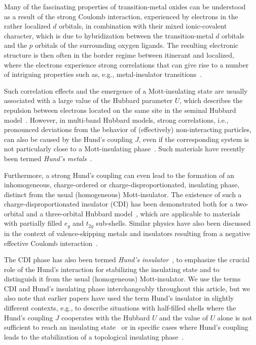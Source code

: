 \documentclass[aps,prb,twocolumn,superscriptaddress,10pt]{revtex4-1}
\begin{document}
Many of the fascinating properties of transition-metal oxides can be understood as a result of the strong Coulomb interaction, experienced by electrons in the rather localized $d$ orbitals, in combination with their mixed ionic-covalent character, which is due to hybridization between the transition-metal $d$ orbitals and the $p$ orbitals of the surrounding oxygen ligands. The resulting electronic structure is then often in the border regime between itinerant and localized, where the electrons experience strong correlations that can give rise to a number of intriguing properties such as, e.g., metal-insulator transitions~\cite{imada_metal-insulator_1998}.

Such correlation effects and the emergence of a Mott-insulating state are usually associated with a large value of the Hubbard parameter $U$, which describes the repulsion between electrons located on the same site in the seminal Hubbard model~\cite{hubbard_electron_1963, kanamori_electron_1963}. However, in multi-band Hubbard models, strong correlations, i.e., pronounced deviations from the behavior of (effectively) non-interacting particles, can also be caused by the Hund's coupling $J$, even if the corresponding system is not particularly close to a Mott-insulating phase~\cite{georges_strong_2013}. Such materials have recently been termed \emph{Hund's metals}~\cite{yin_kinetic_2011, chatzieleftheriou_enhancement_2020, richaud_interaction-resistant_2021}.
%

Furthermore, a strong Hund's coupling can even lead to the formation of an inhomogeneous, charge-ordered or charge-disproportionated, insulating phase, distinct from the usual (homogeneous) Mott-insulator. The existence of such a charge-disproportionated insulator (CDI) has been demonstrated both for a two-orbital and a three-orbital Hubbard model~\cite{subedi_low-energy_2015, isidori_charge_2019, ryee_nonlocal_2020}, which are applicable to materials with partially filled $e_g$ and $t_{2g}$ sub-shells. Similar physics have also been discussed in the context of valence-skipping metals and insulators resulting from a negative effective Coulomb interaction~\cite{strand_valence-skipping_2014}.

The CDI phase has also been termed \emph{Hund's insulator}~\cite{isidori_charge_2019, ryee_nonlocal_2020, springer_osmates_2020}, to emphasize the crucial role of the Hund's interaction for stabilizing the insulating state and to distinguish it from the usual (homogeneous) Mott-insulator. 
We use the terms CDI and Hund's insulating phase interchangeably throughout this article, but we also note that earlier papers have used the term Hund's insulator in slightly different contexts, e.g., to describe situations with half-filled shells where the Hund's coupling $J$ cooperates with the Hubbard $U$ and the value of $U$ alone is not sufficient to reach an insulating state~\cite{mcnally_hunds_2015} or in specific cases where Hund's coupling leads to the stabilization of a topological insulating phase~\cite{budich_fluctuation-driven_2013}.
\end{document}
